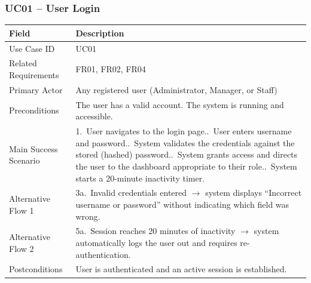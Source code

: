\documentclass[11pt,a4paper]{article}
\begin{document}
\subsubsection*{UC01 -- User Login}
\begin{longtable}{@{}p{3.2cm}p{11.3cm}@{}}
\toprule
Field & Description \\
\midrule
\endhead
Use Case ID & UC01 \\
Related Requirements & FR01, FR02, FR04 \\
Primary Actor & Any registered user (Administrator, Manager, or Staff) \\
Preconditions & The user has a valid account. The system is running and
accessible. \\
Main Success Scenario &
1.\ User navigates to the login page.\newline
2.\ User enters username and password.\newline
3.\ System validates the credentials against the stored (hashed) password.\newline
4.\ System grants access and directs the user to the dashboard appropriate
to their role.\newline
5.\ System starts a 20-minute inactivity timer. \\
Alternative Flow 1 & 3a.\ Invalid credentials entered $\rightarrow$
system displays ``Incorrect username or password'' without indicating
which field was wrong. \\
Alternative Flow 2 & 5a.\ Session reaches 20 minutes of inactivity
$\rightarrow$ system automatically logs the user out and requires
re-authentication. \\
Postconditions & User is authenticated and an active session is
established. \\
\bottomrule
\end{longtable}
\end{document}
